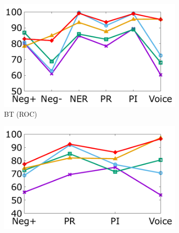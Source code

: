 

\begin{figure}[!th]
\centering
\begin{subfigure}[b]{0.23\textwidth}
\centering
\includegraphics[width=\columnwidth]{data/roc_bert.pdf}
\caption{BT (ROC)}
\label{fig:roc_bert}
\end{subfigure}
\hfill
\begin{subfigure}[b]{0.23\textwidth}
\centering
\includegraphics[width=\columnwidth]{data/copa_bert.pdf}

\end{subfigure}
\end{figure}
